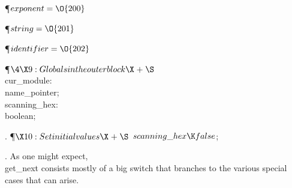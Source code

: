 \Y\P\D {}$\\{exponent}=\O{200}$\par
\P\D {}$\\{string}=\O{201}$%
\par
\P\D {}$\\{identifier}=\O{202}$\par
\Y\P$\4\X9:Globals in the outer block\X\mathrel{+}\S$\6
\4\\{cur\_module}: \\{name\_pointer};\6
\4\\{scanning\_hex}: \\{boolean};%
\par
\fi

. \P$\X10:Set initial values\X\mathrel{+}\S$\6
$\\{scanning\_hex}\K\\{false}$;\par
\fi

. As one might expect, \\{get\_next} consists mostly of a big switch
that branches to the various special cases that can arise.

